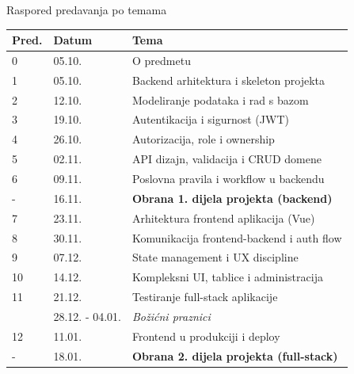 \begin{frame}[shrink=15]{Raspored predavanja po temama}
	\begin{tabular}{@{}lll@{}}
		\toprule
		\textbf{Pred.} & \textbf{Datum} & \textbf{Tema} \\
		\midrule
		0  & 05.10. & O predmetu \\
		1  & 05.10. & Backend arhitektura i skeleton projekta \\
		2  & 12.10. & Modeliranje podataka i rad s bazom \\
		3  & 19.10. & Autentikacija i sigurnost (JWT) \\
		4  & 26.10. & Autorizacija, role i ownership \\
		5  & 02.11. & API dizajn, validacija i CRUD domene \\
		6  & 09.11. & Poslovna pravila i workflow u backendu \\
		-  & 16.11. & \textbf{Obrana 1. dijela projekta (backend)} \\
		7  & 23.11. & Arhitektura frontend aplikacija (Vue) \\
		8  & 30.11. & Komunikacija frontend-backend i auth flow \\
		9  & 07.12. & State management i UX discipline \\
		10 & 14.12. & Kompleksni UI, tablice i administracija \\
		11 & 21.12. & Testiranje full-stack aplikacije \\
		& 28.12. - 04.01. & \emph{Božićni praznici} \\
		12 & 11.01. & Frontend u produkciji i deploy \\
		-  & 18.01. & \textbf{Obrana 2. dijela projekta (full-stack)} \\
		\bottomrule
	\end{tabular}
\end{frame}

